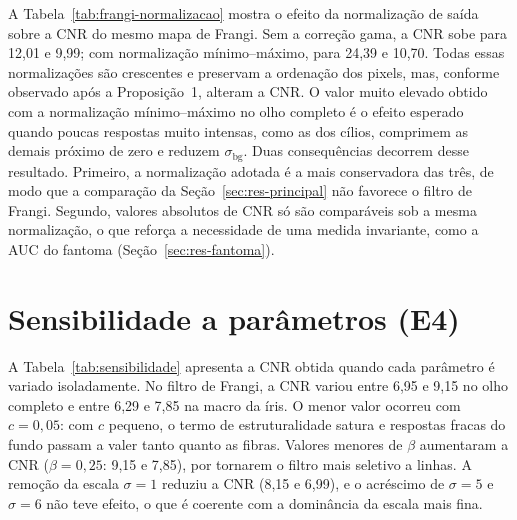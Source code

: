 \documentclass[12pt, oneside, a4paper, chapter=TITLE, section=TITLE,
               english, brazil]{abntex2}
\newcommand{\secao}[1]{\section[\texorpdfstring{\protect\MakeTextUppercase{#1}}{#1}]{#1}}
\begin{document}
A Tabela~\ref{tab:frangi-normalizacao} mostra o efeito da normalização de
saída sobre a CNR do mesmo mapa de Frangi. Sem a correção gama, a CNR sobe
para 12,01 e 9,99; com normalização mínimo--máximo, para 24,39 e 10,70. Todas
essas normalizações são crescentes e preservam a ordenação dos pixels, mas,
conforme observado após a Proposição~1, alteram a CNR. O valor muito elevado
obtido com a normalização mínimo--máximo no olho completo é o efeito esperado
quando poucas respostas muito intensas, como as dos cílios, comprimem as
demais próximo de zero e reduzem $\sigma_{\text{bg}}$. Duas consequências
decorrem desse resultado. Primeiro, a normalização adotada é a mais
conservadora das três, de modo que a comparação da
Seção~\ref{sec:res-principal} não favorece o filtro de Frangi. Segundo,
valores absolutos de CNR só são comparáveis sob a mesma normalização, o que
reforça a necessidade de uma medida invariante, como a AUC do fantoma
(Seção~\ref{sec:res-fantoma}).

\begin{table}[htbp]
  \caption{Efeito da normalização de saída sobre a CNR do mapa de Frangi
  (E3)}
  \label{tab:frangi-normalizacao}
  \centering\footnotesize
  
\end{table}

\secao{Sensibilidade a parâmetros (E4)}
\label{sec:res-sensibilidade}

A Tabela~\ref{tab:sensibilidade} apresenta a CNR obtida quando cada parâmetro
é variado isoladamente. No filtro de Frangi, a CNR variou entre 6,95 e 9,15 no
olho completo e entre 6,29 e 7,85 na macro da íris. O menor valor ocorreu com
$c = 0{,}05$: com $c$ pequeno, o termo de estruturalidade satura e respostas
fracas do fundo passam a valer tanto quanto as fibras. Valores menores de
$\beta$ aumentaram a CNR ($\beta = 0{,}25$: 9,15 e 7,85), por tornarem o
filtro mais seletivo a linhas. A remoção da escala $\sigma = 1$ reduziu a CNR
(8,15 e 6,99), e o acréscimo de $\sigma = 5$ e $\sigma = 6$ não teve efeito,
o que é coerente com a dominância da escala mais fina.

\begin{table}[htbp]
  \caption{Sensibilidade da CNR aos parâmetros de cada realce (E4)}
  \label{tab:sensibilidade}
  \centering\footnotesize
  
\end{table}
\end{document}

